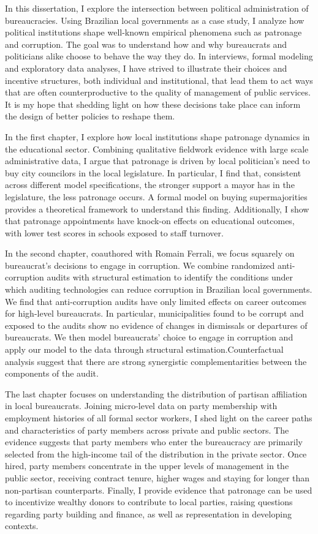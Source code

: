 \documentclass[12pt]{report}
\theoremstyle{definition}
\begin{document}
In this dissertation, I explore the intersection between political administration of bureaucracies. Using Brazilian local governments as a case study, I analyze how political institutions shape well-known empirical phenomena such as patronage and corruption. The goal was to understand how and why bureaucrats and politicians alike choose to behave the way they do. In interviews, formal modeling and exploratory data analyses, I have strived to illustrate their choices and incentive structures, both individual and institutional, that lead them to act ways that are often counterproductive to the quality of management of public services. It is my hope that shedding light on how these decisions take place can inform the design of better policies to reshape them.

In the first chapter, I explore how local institutions shape patronage dynamics in the educational sector. Combining qualitative fieldwork evidence with large scale administrative data, I argue that patronage is driven by local politician's need to buy city councilors in the local legislature. In particular, I find that, consistent across different model specifications, the stronger support a mayor has in the legislature, the less patronage occurs. A formal model on buying supermajorities provides a theoretical framework to understand this finding. Additionally, I show that patronage appointments have knock-on effects on educational outcomes, with lower test scores in schools exposed to staff turnover.

In the second chapter, coauthored with Romain Ferrali, we focus squarely on bureaucrat's decisions to engage in corruption. We combine randomized anti-corruption audits with structural estimation to identify the conditions under which auditing technologies can reduce corruption in Brazilian local governments. We find that anti-corruption audits have only limited effects on career outcomes for high-level bureaucrats. In particular, municipalities found to be corrupt and exposed to the audits show no evidence of changes in dismissals or departures of bureaucrats. We then model bureaucrats' choice to engage in corruption and apply our model to the data through structural estimation.Counterfactual analysis suggest that there are strong synergistic complementarities between the components of the audit.

The last chapter focuses on understanding the distribution of partisan affiliation in local bureaucrats. Joining micro-level data on party membership with employment histories of all formal sector workers, I shed light on the career paths and characteristics of party members across private and public sectors. The evidence suggests that party members who enter the bureaucracy are primarily selected from the high-income tail of the distribution in the private sector. Once hired, party members concentrate in the upper levels of management in the public sector, receiving contract tenure, higher wages and staying for longer than non-partisan counterparts. Finally, I provide evidence that patronage can be used to incentivize wealthy donors to contribute to local parties, raising questions regarding party building and finance, as well as representation in developing contexts.
\end{document}
